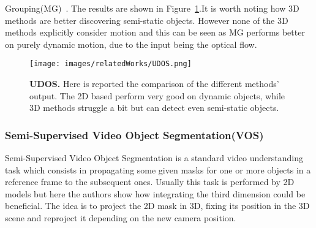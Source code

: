  Grouping(MG)~\cite{MG}. The results are shown in Figure~\ref{fig:UDOS}.It is worth noting how 3D methods are better discovering semi-static objects.
 However none of the 3D methods explicitly consider motion and this can be seen as MG performs better on purely dynamic motion, due to the input being the optical flow.
\begin{figure}[t]
    \centering
    \texttt{[image: images/relatedWorks/UDOS.png]} 
    \caption{\textbf{UDOS.} Here is reported the comparison of the different methods' output.
    The 2D based perform very good on dynamic objects, while 3D methods struggle a bit but can detect even semi-static objects.}\label{fig:UDOS}
\end{figure}

\subsubsection{Semi-Supervised Video Object Segmentation(VOS)}
Semi-Supervised Video Object Segmentation is a standard video understanding task which consists in propagating some given masks for one or more
objects in a reference frame to the subsequent ones. Usually this task is performed by 2D models but here the authors show how integrating the third dimension
could be beneficial. The idea is to project the 2D mask in 3D, fixing its position in the 3D scene and reproject it depending on the new camera position.

